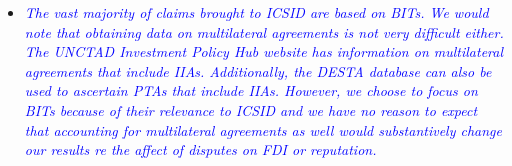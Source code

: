 \begin{enumerate}
	\begin{itemize}
		\item \textcolor{blue}{
		\emph{ 
		The vast majority of claims brought to ICSID are based on BITs. We would note that obtaining data on multilateral agreements is not very difficult either. The UNCTAD Investment Policy Hub website has information on multilateral agreements that include IIAs. Additionally, the DESTA database can also be used to ascertain PTAs that include IIAs. However, we choose to focus on BITs because of their relevance to ICSID and we have no reason to expect that accounting for multilateral agreements as well would substantively change our results re the affect of disputes on FDI or reputation. 
		}}
	\end{itemize}	
\end{enumerate}
